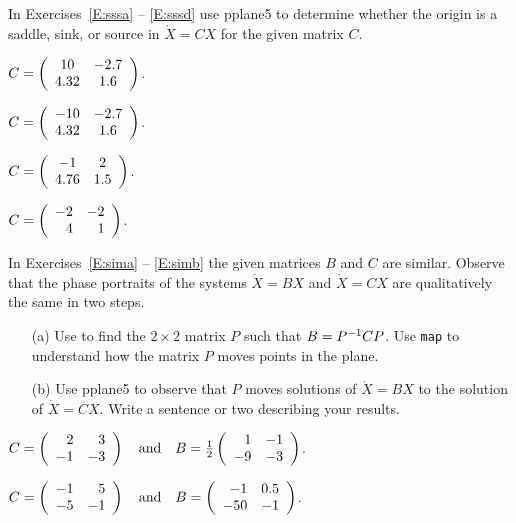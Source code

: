 \documentclass{ximera}
\begin{document}
\CEXER

\noindent In Exercises~\ref{E:sssa} -- \ref{E:sssd} use {\sf pplane5} to
determine whether the origin is a saddle, sink, or source in $\dot{X}=CX$
for the given matrix $C$.
\begin{exercise} \label{E:sssa}
$C=\left(\begin{array}{cc} 10 & -2.7\\ 4.32 &1.6\end{array}\right)$.
\end{exercise}
\begin{exercise} \label{E:sssb}
$C=\left(\begin{array}{cc} -10 & -2.7\\ 4.32 &1.6\end{array}\right)$.
\end{exercise}
\begin{exercise} \label{E:sssc}
$C=\left(\begin{array}{cc} -1 & 2\\ 4.76 &1.5\end{array}\right)$.
\end{exercise}
\begin{exercise} \label{E:sssd}
$C=\left(\begin{array}{rr} -2 & -2\\ 4 &1\end{array}\right)$.
\end{exercise}


\noindent In Exercises~\ref{E:sima} -- \ref{E:simb} the given matrices $B$
and $C$ are similar.  Observe that the phase portraits of the systems
$\dot{X}=BX$ and $\dot{X}=CX$ are qualitatively the same in two steps.
\begin{itemize}
\item[(a)]  Use \Matlab to find the $2\times 2$ matrix $P$ such that
$B=P^{-1} CP$.  Use {\tt map} to understand how the matrix $P$ moves points 
in the plane.
\item[(b)]  Use {\sf pplane5} to observe that $P$ moves solutions of
$\dot{X}=BX$ to the solution of $\dot{X}=CX$.  Write a sentence or two describing your results.
\end{itemize}
\begin{exercise} \label{E:sima}
$C = \left(\begin{array}{rr} 2 & 3\\ -1 &-3\end{array}\right) \quad\mbox{and}\quad B = \frac{1}{2}\left(\begin{array}{rr} 1 & -1\\ -9 &-3\end{array}\right)$.
\end{exercise}
\begin{exercise} \label{E:simb}
$C = \left(\begin{array}{rr} -1 & 5\\ -5 &-1\end{array}\right) \quad\mbox{and}\quad B = \left(\begin{array}{rr} -1 & 0.5\\ -50 &-1\end{array}\right)$.
\end{exercise}
\end{document}

